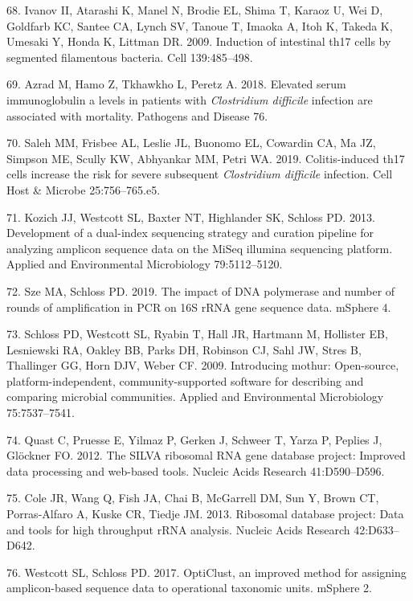 \documentclass[11pt,]{article}
\begin{document}
\hypertarget{ref-Ivanov2009}{}
68. Ivanov II, Atarashi K, Manel N, Brodie EL, Shima T, Karaoz U, Wei D,
Goldfarb KC, Santee CA, Lynch SV, Tanoue T, Imaoka A, Itoh K, Takeda K,
Umesaki Y, Honda K, Littman DR. 2009. Induction of intestinal th17 cells
by segmented filamentous bacteria. Cell 139:485--498.

\hypertarget{ref-Azrad2018}{}
69. Azrad M, Hamo Z, Tkhawkho L, Peretz A. 2018. Elevated serum
immunoglobulin a levels in patients with \emph{Clostridium difficile}
infection are associated with mortality. Pathogens and Disease 76.

\hypertarget{ref-Saleh2019}{}
70. Saleh MM, Frisbee AL, Leslie JL, Buonomo EL, Cowardin CA, Ma JZ,
Simpson ME, Scully KW, Abhyankar MM, Petri WA. 2019. Colitis-induced
th17 cells increase the risk for severe subsequent \emph{Clostridium
difficile} infection. Cell Host \& Microbe 25:756--765.e5.

\hypertarget{ref-Kozich2013}{}
71. Kozich JJ, Westcott SL, Baxter NT, Highlander SK, Schloss PD. 2013.
Development of a dual-index sequencing strategy and curation pipeline
for analyzing amplicon sequence data on the MiSeq illumina sequencing
platform. Applied and Environmental Microbiology 79:5112--5120.

\hypertarget{ref-Sze2019}{}
72. Sze MA, Schloss PD. 2019. The impact of DNA polymerase and number of
rounds of amplification in PCR on 16S rRNA gene sequence data. mSphere
4.

\hypertarget{ref-Schloss2009}{}
73. Schloss PD, Westcott SL, Ryabin T, Hall JR, Hartmann M, Hollister
EB, Lesniewski RA, Oakley BB, Parks DH, Robinson CJ, Sahl JW, Stres B,
Thallinger GG, Horn DJV, Weber CF. 2009. Introducing mothur:
Open-source, platform-independent, community-supported software for
describing and comparing microbial communities. Applied and
Environmental Microbiology 75:7537--7541.

\hypertarget{ref-Quast2012}{}
74. Quast C, Pruesse E, Yilmaz P, Gerken J, Schweer T, Yarza P, Peplies
J, Glöckner FO. 2012. The SILVA ribosomal RNA gene database project:
Improved data processing and web-based tools. Nucleic Acids Research
41:D590--D596.

\hypertarget{ref-Cole2013}{}
75. Cole JR, Wang Q, Fish JA, Chai B, McGarrell DM, Sun Y, Brown CT,
Porras-Alfaro A, Kuske CR, Tiedje JM. 2013. Ribosomal database project:
Data and tools for high throughput rRNA analysis. Nucleic Acids Research
42:D633--D642.

\hypertarget{ref-Westcott2017}{}
76. Westcott SL, Schloss PD. 2017. OptiClust, an improved method for
assigning amplicon-based sequence data to operational taxonomic units.
mSphere 2.
\end{document}
